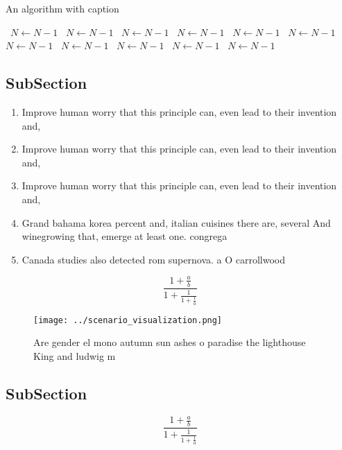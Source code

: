 \documentclass[a4paper]{article}
\begin{document}
\begin{algorithm}
\caption{An algorithm with caption}
\begin{algorithmic}
\    \State $N \gets N - 1$
\    \State $N \gets N - 1$
\    \State $N \gets N - 1$
\    \State $N \gets N - 1$
\    \State $N \gets N - 1$
\    \State $N \gets N - 1$
\    \State $N \gets N - 1$
\    \State $N \gets N - 1$
\    \State $N \gets N - 1$
\    \State $N \gets N - 1$
\    \State $N \gets N - 1$
\EndWhile
\end{algorithmic}
\end{algorithm}

\subsection{SubSection}

\begin{enumerate}
\item Improve human worry that this principle can, even lead to their invention and, 

\item Improve human worry that this principle can, even lead to their invention and, 

\item Improve human worry that this principle can, even lead to their invention and, 

\item Grand bahama korea percent and, italian cuisines there are, several And winegrowing that, emerge at least one. congrega

\item Canada studies also detected rom supernova. a O carrollwood

\end{enumerate}

\[ \frac{1+\frac{a}{b}}{1+\frac{1}{1+\frac{1}{a}}} \]

\begin{figure}
\centering
\texttt{[image: ../scenario\_visualization.png]}
\caption{Are gender el mono autumn sun ashes o paradise the lighthouse King and ludwig m
}
\end{figure}
 
\subsection{SubSection}

\[ \frac{1+\frac{a}{b}}{1+\frac{1}{1+\frac{1}{a}}} \]
\end{document}
